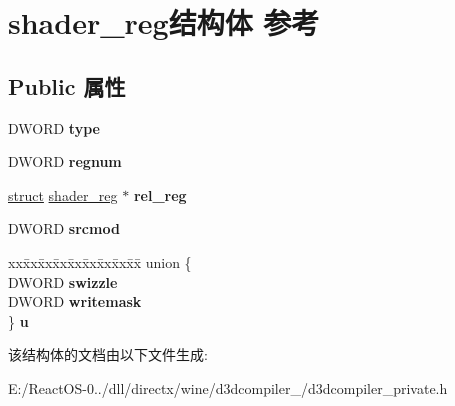 \hypertarget{structshader__reg}{}\section{shader\+\_\+reg结构体 参考}
\label{structshader__reg}
\subsection*{Public 属性}
\begin{DoxyCompactItemize}
\item 
\mbox{\label{structshader__reg_a2593ae4c8238186fb9aa7182f7304762}} 
D\+W\+O\+RD {\bfseries type}
\item 
\mbox{\label{structshader__reg_aee2e67911ee6dc56a0d3bb89fc1a24b3}} 
D\+W\+O\+RD {\bfseries regnum}
\item 
\mbox{\label{structshader__reg_a407b63cd922ba55efe9ea94846f6302e}} 
\hyperlink{interfacestruct}{struct} \hyperlink{structshader__reg}{shader\+\_\+reg} $\ast$ {\bfseries rel\+\_\+reg}
\item 
\mbox{\label{structshader__reg_a090e9d26d53bf142ba1bbd91b4d70db7}} 
D\+W\+O\+RD {\bfseries srcmod}
\item 
\mbox{\label{structshader__reg_a8512b082d2911f64c93a1d829bb09d2a}} 
\begin{tabbing}
xx\=xx\=xx\=xx\=xx\=xx\=xx\=xx\=xx\=\kill
union \{\\
\>DWORD {\bfseries swizzle}\\
\>DWORD {\bfseries writemask}\\
\} {\bfseries u}\\

\end{tabbing}\end{DoxyCompactItemize}


该结构体的文档由以下文件生成\+:\begin{DoxyCompactItemize}
\item 
E\+:/\+React\+O\+S-\/0../dll/directx/wine/d3dcompiler\+\_/d3dcompiler\+\_\+private.\+h\end{DoxyCompactItemize}
